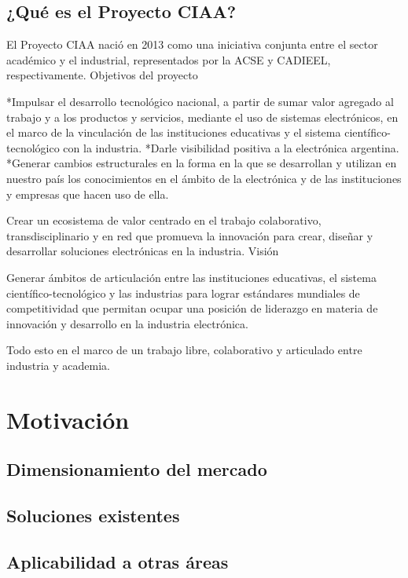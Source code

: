 \subsection{¿Qué es el Proyecto CIAA?}
\label{proyecto-ciaa}

El Proyecto CIAA nació en 2013 como una iniciativa conjunta entre el sector académico y el industrial, representados por la ACSE y CADIEEL, respectivamente.
Objetivos del proyecto

*Impulsar el desarrollo tecnológico nacional, a partir de sumar valor agregado al trabajo y a los productos y servicios, mediante el uso de sistemas electrónicos, en el marco de la vinculación de las instituciones educativas y el sistema científico-tecnológico con la industria.
*Darle visibilidad positiva a la electrónica argentina.
*Generar cambios estructurales en la forma en la que se desarrollan y utilizan en nuestro país los conocimientos en el ámbito de la electrónica y de las instituciones y empresas que hacen uso de ella.

Crear un ecosistema de valor centrado en el trabajo colaborativo, transdisciplinario y en red que promueva la innovación para crear, diseñar y desarrollar soluciones electrónicas en la industria.
Visión

Generar ámbitos de articulación entre las instituciones educativas, el sistema científico-tecnológico y las industrias para lograr estándares mundiales de competitividad que permitan ocupar una posición de liderazgo en materia de innovación y desarrollo en la industria electrónica.

Todo esto en el marco de un trabajo libre, colaborativo y articulado entre industria y academia. 


\section{Motivación}


\subsection{Dimensionamiento del mercado}

\subsection{Soluciones existentes}

\subsection{Aplicabilidad a otras áreas}






